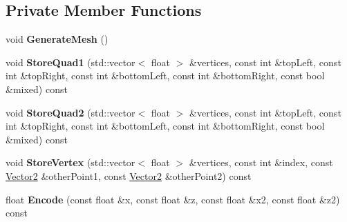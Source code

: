 \subsection*{Private Member Functions}
\begin{DoxyCompactItemize}
\item 
\mbox{\label{class_flounder_1_1_water_a8649b3bae21a6911b3052b23e4e8492b}} 
void {\bfseries Generate\+Mesh} ()
\item 
\mbox{\label{class_flounder_1_1_water_a5810173425d056e6368a8c65fd967aca}} 
void {\bfseries Store\+Quad1} (std\+::vector$<$ float $>$ \&vertices, const int \&top\+Left, const int \&top\+Right, const int \&bottom\+Left, const int \&bottom\+Right, const bool \&mixed) const
\item 
\mbox{\label{class_flounder_1_1_water_a16379b2013e04089a8cbfa12aa323302}} 
void {\bfseries Store\+Quad2} (std\+::vector$<$ float $>$ \&vertices, const int \&top\+Left, const int \&top\+Right, const int \&bottom\+Left, const int \&bottom\+Right, const bool \&mixed) const
\item 
\mbox{\label{class_flounder_1_1_water_af76e0f166be865a454d346003efa5451}} 
void {\bfseries Store\+Vertex} (std\+::vector$<$ float $>$ \&vertices, const int \&index, const \hyperlink{class_flounder_1_1_vector2}{Vector2} \&other\+Point1, const \hyperlink{class_flounder_1_1_vector2}{Vector2} \&other\+Point2) const
\item 
\mbox{\label{class_flounder_1_1_water_a549cd25b4509197e0596d4f89f542eae}} 
float {\bfseries Encode} (const float \&x, const float \&z, const float \&x2, const float \&z2) const
\end{DoxyCompactItemize}
